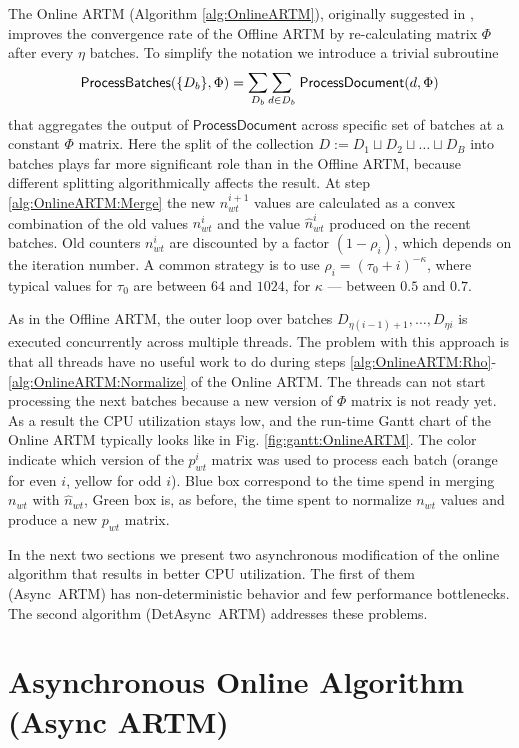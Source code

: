\documentclass[russian,english]{llncs}
\newcommand{\kw}[1]{\textsf{#1}}
\begin{document}
The \kw{Online ARTM} (Algorithm \ref{alg:OnlineARTM}), originally suggested in \cite{hoffman10online},
improves the convergence rate of the \kw{Offline ARTM}
by re-calculating matrix $\Phi$ after every $\eta$ batches.
To simplify the notation
we introduce a trivial subroutine
\[
\kw{ProcessBatches}(\{D_b\}, \Phi) = \mathlarger\sum\limits_{D_b} \mathlarger\sum\limits_{d \in D_b} \; \kw{ProcessDocument}(d, \Phi) \\
\]
that aggregates the output of $\kw{ProcessDocument}$ across specific set of batches at a constant $\Phi$ matrix.
Here the split of the collection $D := D_1 \sqcup D_2 \sqcup \dots \sqcup D_B$
into batches
plays far more significant role than in the \kw{Offline ARTM},
because different splitting algorithmically affects the result.
At step \ref{alg:OnlineARTM:Merge} the new $n_{wt}^{i+1}$ values are calculated as a convex combination
of the old values $n_{wt}^{i}$ and the value $\hat n_{wt}^{i}$ produced on the recent batches.
Old counters $n_{wt}^{i}$ are discounted by a factor $(1 - \rho_i)$,
which depends on the iteration number. A common strategy is to use $\rho_i = (\tau_0 + i)^{-\kappa}$,
where typical values for $\tau_0$ are between $64$ and $1024$, for $\kappa$ --- between $0.5$ and $0.7$.

As in the \kw{Offline ARTM}, the outer loop over batches
$D_{\eta (i - 1) + 1}, \dots, D_{\eta i}$ is executed concurrently across multiple threads.
The problem with this approach is that all threads have no useful work to do during steps
\ref{alg:OnlineARTM:Rho}-\ref{alg:OnlineARTM:Normalize} of the \kw{Online ARTM}.
The threads can not start processing the next batches because a new version of $\Phi$ matrix is not ready yet.
As a result the CPU utilization stays low, and the run-time Gantt chart of the \kw{Online ARTM} typically looks like in Fig. \ref{fig:gantt:OnlineARTM}.
The color indicate which version of the $p^i_{wt}$ matrix was used to process each batch
(orange for even $i$, yellow for odd $i$).
Blue box correspond to the time spend in merging $n_{wt}$ with $\hat n_{wt}$,
Green box is, as before, the time spent to normalize $n_{wt}$ values and produce a new $p_{wt}$ matrix.

In the next two sections we present two asynchronous modification of the online algorithm that results in better CPU utilization.
The first of them (\kw{Async~ARTM}) has non-deterministic behavior and few performance bottlenecks.
The second algorithm (\kw{DetAsync~ARTM}) addresses these problems.

\section{Asynchronous Online Algorithm (\kw{Async ARTM})}
\label{sec:AsyncARTM}
\end{document}
